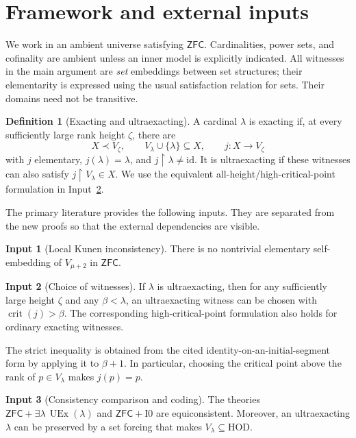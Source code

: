 \documentclass[11pt,letterpaper]{article}
\theoremstyle{definition}
\newtheorem{definition}{Definition}[section]
\newcommand{\ZFC}{\mathsf{ZFC}}
\newcommand{\HOD}{\mathrm{HOD}}
\newcommand{\UEx}{\operatorname{UEx}}
\newcommand{\crit}{\operatorname{crit}}
\newcommand{\id}{\mathrm{id}}
\newcommand{\restr}{\mathbin{\upharpoonright}}
\newcommand{\Izero}{\mathrm{I0}}
\newtheorem{inputthm}{Input}
\numberwithin{equation}{section}
\begin{document}
\section{Framework and external inputs}\label{sec:framework}

We work in an ambient universe satisfying $\ZFC$. Cardinalities, power sets,
and cofinality are ambient unless an inner model is explicitly indicated.
All witnesses in the main argument are \emph{set} embeddings between set
structures; their elementarity is expressed using the usual satisfaction
relation for sets. Their domains need not be transitive.

\begin{definition}[Exacting and ultraexacting]\label{def:uex}
A cardinal $\lambda$ is exacting if, at every sufficiently large rank height
$\zeta$, there are
\[
 X\prec V_\zeta,\qquad V_\lambda\cup\{\lambda\}\subseteq X,
 \qquad j:X\longrightarrow V_\zeta
\]
with $j$ elementary, $j(\lambda)=\lambda$, and $j\restr\lambda\ne\id$.
It is ultraexacting if these witnesses can also satisfy
$j\restr V_\lambda\in X$. We use the equivalent all-height/high-critical-point
formulation in Input~\ref{in:high}.
\end{definition}

The primary literature provides the following inputs. They are separated
from the new proofs so that the external dependencies are visible.

\begin{inputthm}[Local Kunen inconsistency]\label{in:kunen}
There is no nontrivial elementary self-embedding of $V_{\mu+2}$ in $\ZFC$.
\cite{kunen,cover}
\end{inputthm}

\begin{inputthm}[Choice of witnesses]\label{in:high}
If $\lambda$ is ultraexacting, then for any sufficiently large height $\zeta$
and any $\beta<\lambda$, an ultraexacting witness can be chosen with
$\crit(j)>\beta$. The corresponding high-critical-point formulation also
holds for ordinary exacting witnesses.
\cite[Lemmas 2.3 and 3.2]{abl}
\end{inputthm}

The strict inequality is obtained from the cited identity-on-an-initial-segment
form by applying it to $\beta+1$. In particular, choosing the critical point
above the rank of $p\in V_\lambda$ makes $j(p)=p$.

\begin{inputthm}[Consistency comparison and coding]\label{in:cons}
The theories $\ZFC+\exists\lambda\,\UEx(\lambda)$ and $\ZFC+\Izero$ are
equiconsistent. Moreover, an ultraexacting $\lambda$ can be preserved by a set
forcing that makes $V_\lambda\subseteq\HOD$.
\cite[Theorem 4.5 and Proposition 3.9]{abgl}
\end{inputthm}
\end{document}
